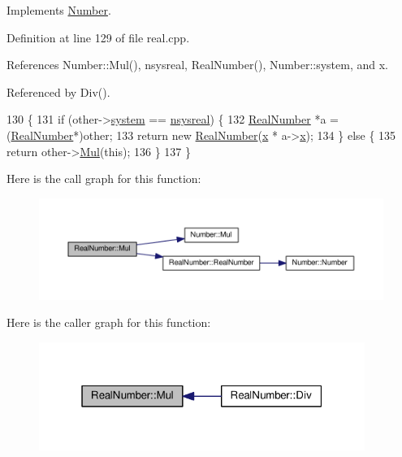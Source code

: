 Implements \hyperlink{structNumber_ab853199817c9cd4e43c43aaedc4eef35}{Number}.



Definition at line 129 of file real.\+cpp.



References Number\+::\+Mul(), nsysreal, Real\+Number(), Number\+::system, and x.



Referenced by Div().


\begin{DoxyCode}
130 \{
131     \textcolor{keywordflow}{if} (other->\hyperlink{structNumber_a2ceda5601c42288626e76b06878e7476}{system} == \hyperlink{numb_8h_a1475a201d2346881ce88dfbacf628c7dae72cf8673109b15268d1c0837e8bff86}{nsysreal}) \{
132         \hyperlink{structRealNumber}{RealNumber} *a = (\hyperlink{structRealNumber}{RealNumber}*)other;
133         \textcolor{keywordflow}{return} \textcolor{keyword}{new} \hyperlink{structRealNumber_aa61264f519c95ec9b63ab94c352bcc67}{RealNumber}(\hyperlink{structRealNumber_ac33d80bee75448490199a0aa48ccce1e}{x} * a->\hyperlink{structRealNumber_ac33d80bee75448490199a0aa48ccce1e}{x});
134     \} \textcolor{keywordflow}{else} \{
135         \textcolor{keywordflow}{return} other->\hyperlink{structNumber_ab853199817c9cd4e43c43aaedc4eef35}{Mul}(\textcolor{keyword}{this});
136     \}
137 \}
\end{DoxyCode}


Here is the call graph for this function\+:
\nopagebreak
\begin{figure}[H]
\begin{center}
\leavevmode
\includegraphics[width=350pt]{d2/d49/structRealNumber_af5491d836bb591e1291f4f9eee809902_cgraph}
\end{center}
\end{figure}




Here is the caller graph for this function\+:
\nopagebreak
\begin{figure}[H]
\begin{center}
\leavevmode
\includegraphics[width=301pt]{d2/d49/structRealNumber_af5491d836bb591e1291f4f9eee809902_icgraph}
\end{center}
\end{figure}


